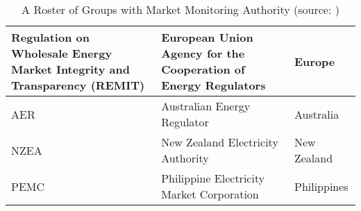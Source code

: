 \begin{table}[ht]
\begin{tabular}{|p{8cm}|p{6cm}|p{2cm}|}
        \hline
        Regulation on Wholesale Energy Market \newline Integrity and Transparency (REMIT) & European Union Agency for the Cooperation of Energy Regulators & Europe \\
        \hline
        AER & Australian Energy Regulator & Australia \\
        \hline
        NZEA & New Zealand Electricity Authority & New Zealand \\
        \hline
        PEMC & Philippine Electricity Market \newline Corporation & Philippines \\
        \hline
    \end{tabular}
    \caption{A Roster of Groups with Market Monitoring Authority (source: \cite{imm-usea})}
    \label{tab:mmu-roster}
\end{table}